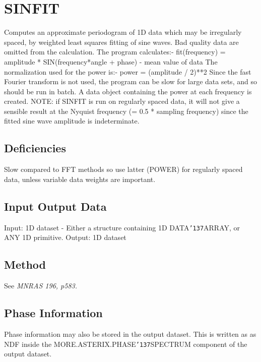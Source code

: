 \documentclass{book}
\renewcommand{\_}{{\tt\char'137}}     %
\begin{document}
\section{SINFIT}
Computes an approximate periodogram of 1D data which may be
irregularly spaced, by weighted least squares fitting of sine
waves. Bad quality data are omitted from the calculation. The
program calculates:-
fit(frequency) = amplitude * SIN(frequency*angle + phase)
- mean value of data
The normalization used for the power is:-
power = (amplitude / 2)**2
Since the fast Fourier transform is not used, the program can be
slow for large data sets, and so should be run in batch.
A data object containing the power at each frequency is created.
NOTE: if SINFIT is run on regularly spaced data, it
will not give a sensible result at the Nyquist
frequency (= 0.5 * sampling frequency) since the
fitted sine wave amplitude is indeterminate.
\subsection{Deficiencies}
Slow compared to FFT methods so use latter (POWER) for regularly
spaced data, unless variable data weights are important.

\subsection{Input Output Data}
Input: 1D dataset - Either a structure containing 1D DATA\_ARRAY,
or ANY 1D primitive.
Output: 1D dataset
\subsection{Method}
See {\em MNRAS 196, p583.}
\subsection{Phase Information}
Phase information may also be stored in the output dataset. This
is written as as NDF inside the MORE.ASTERIX.PHASE\_SPECTRUM
component of the output dataset.
\end{document}
